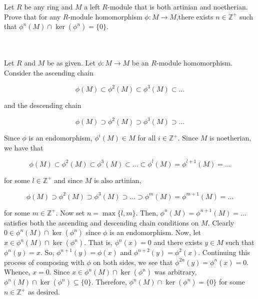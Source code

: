 Let $R$ be any ring and $M$ a left $R$-module that is both artinian and noetherian. Prove that for
any $R$-module homomorphism $\phi:M\rightarrow M$,there exists $n\in\mathbb{Z}^+$ such that
$\phi^n(M)\cap\ker(\phi^n)=\{0\}$.\\\\

\begin{solution}\renewcommand{\qedsymbol}{}\ \\
    Let $R$ and $M$ be as given. Let $\phi:M\rightarrow M$ be an $R$-module homomorphism. Consider the
    ascending chain

    $$\phi(M)\subset\phi^2(M)\subset\phi^3(M)\subset\ldots$$

    and the descending chain

    $$\phi(M)\supset\phi^2(M)\supset\phi^3(M)\supset\ldots$$

    Since $\phi$ is an endomorphism, $\phi^i(M)\in M$ for all $i\in\mathbb{Z}^+$. Since $M$ is
    noetherian, we have that

    $$\phi(M)\subset\phi^2(M)\subset\phi^3(M)\subset\ldots\subset\phi^l(M)=\phi^{l+1}(M)=\ldots$$

    for some $l\in\mathbb{Z}^+$ and since $M$ is also artinian,

    $$\phi(M)\supset\phi^2(M)\supset\phi^3(M)\supset\ldots\supset\phi^m(M)=\phi^{m+1}(M)=\ldots$$

    for some $m\in\mathbb{Z}^+$. Now set $n=\max\{l,m\}$. Then, $\phi^n(M)=\phi^{n+1}(M)=\ldots$
    satisfies both the ascending and descending chain conditions on $M$. Clearly
    $0\in\phi^n(M)\cap\ker(\phi^n)$ since $\phi$ is an endomorphism. Now, let
    $x\in\phi^n(M)\cap\ker(\phi^n)$. That is, $\phi^n(x)=0$ and there exists $y\in M$ such that
    $\phi^n(y)=x$. So, $\phi^{n+1}(y)=\phi(x)$ and $\phi^{n+2}(y)=\phi^2(x)$. Continuing this process
    of composing with $\phi$ on both sides, we see that $\phi^{2n}(y)=\phi^n(x)=0$. Whence, $x=0$.
    Since $x\in\phi^n(M)\cap\ker(\phi^n)$ was arbitrary, $\phi^n(M)\cap\ker(\phi^n)\subseteq\{0\}$.
    Therefore, $\phi^n(M)\cap\ker(\phi^n)=\{0\}$ for some $n\in\mathbb{Z}^+$ as desired.

\end{solution}